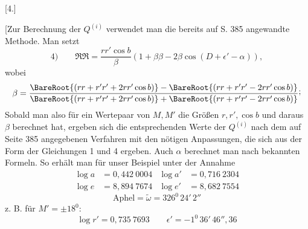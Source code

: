 \clearpage
\par\bigskip{}
\begin{center}[4.]\end{center}
\begingroup\small
\noindent\hspace*{\parindent}[Zur Berechnung der \(Q^{(i)}\) verwendet man die bereits auf S. 385 angewandte Methode. Man setzt
\[
4)\qquad \mathfrak{R}\mathfrak{R}=\frac{rr'\cos b}{\beta}(1+\beta\beta-2\beta\cos(D+\epsilon'-\alpha)),
\]
wobei
\[
\beta=\frac{\BareRoot{(rr+r'r'+2rr'\cos b)}-\BareRoot{(rr+r'r'-2rr'\cos b)}}{\BareRoot{(rr+r'r'+2rr'\cos b)}+\BareRoot{(rr+r'r'-2rr'\cos b)}}\mathpunct{\raisebox{.45ex}{;}}
\]
Sobald man also für ein Wertepaar von \(M,M'\) die Größen \(r,r',\cos b\) und daraus \(\beta\) berechnet hat, ergeben sich die entsprechenden Werte der \(Q^{(i)}\) nach dem auf Seite 385 angegebenen Verfahren mit den nötigen Anpassungen, die sich aus der Form der Gleichungen 1 und 4 ergeben. Auch \(\alpha\) berechnet man nach bekannten Formeln. So erhält man für unser Beispiel unter der Annahme
\[
\begin{aligned}
\log a&=0{,}442\ 0004&\log a'&=0{,}716\ 2304\\
\log e&=8{,}894\ 7674&\log e'&=8{,}682\ 7554
\end{aligned}
\]
\[
\text{Aphel}=\tilde\omega=326^{0}\,24'\,2''
\]
z. B. für \(M'=\pm18^{0}\):
\[
\log r'=0{,}735\ 7693\qquad \epsilon'=-1^{0}\,36'\,46''{,}36
\]
\begingroup\footnotesize\setlength{\arraycolsep}{2pt}
